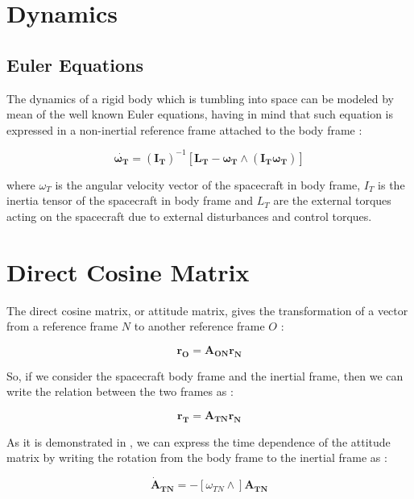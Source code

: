 \section{Dynamics}

\subsection{Euler Equations}

The dynamics of a rigid body which is tumbling into space can be modeled by mean of the well known Euler equations, having in mind that such equation is expressed in a non-inertial reference frame attached to the body frame :

\begin{equation}
  \dot{\mathbf{\omega_T}} = \mathbf{(I_T)}^{-1} \left[\mathbf{L_T} - \mathbf{\omega_T}  \wedge (\mathbf{I_T} \mathbf{\omega_T})\right]
\end{equation}

where \textbf{$\omega_T$} is the angular velocity vector of the spacecraft in body frame, \textbf{$I_T$} is the inertia tensor of the spacecraft in body frame and \textbf{$L_T$} are the external torques acting on the spacecraft due to  external disturbances and control torques.

\section{Direct Cosine Matrix}
The direct cosine matrix, or attitude matrix, gives the transformation of a vector from a reference frame $N$ to another reference frame $O$ :

\begin{equation}
  \mathbf{r_{O}} = \mathbf{A_{ON}} \mathbf{r_{N}}
\end{equation}

So, if we consider the spacecraft body frame and the inertial frame, then we can write the relation between the two frames as :

\begin{equation}
  \mathbf{r_{T}} = \mathbf{A_{TN}} \mathbf{r_{N}}
\end{equation}

As it is demonstrated in \cite{Markley2014}, we can express the time dependence of the attitude matrix by writing the rotation from the body frame to the inertial frame as :

\begin{equation}
  \mathbf{\dot{A}_{TN}}= - [\omega_{TN} \wedge]\mathbf{A_{TN}}
\end{equation}

